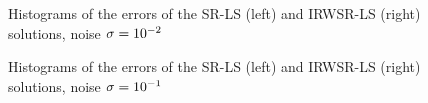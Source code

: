 \begin{figure}%
\centering
\caption{Histograms of the errors of the SR-LS (left) and IRWSR-LS (right) solutions, noise $\protect\sigma = 10^{-2}$}
\label{fig:Noise02IRDW}
\end{figure}

\begin{figure}%
\centering
\caption{Histograms of the errors of the SR-LS (left) and IRWSR-LS (right) solutions, noise $\protect\sigma = 10^{-1}$}
\label{fig:Noise01IRDW}
\end{figure}

